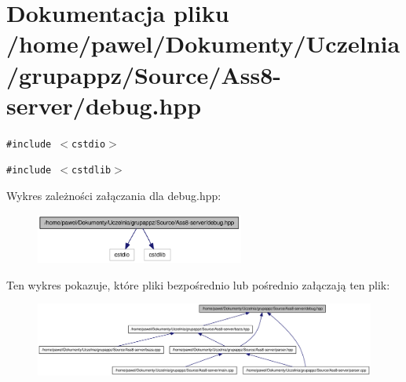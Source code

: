 \hypertarget{a00005}{
\section{Dokumentacja pliku /home/pawel/Dokumenty/Uczelnia/grupappz/Source/Ass8-server/debug.hpp}
\label{a00005}
}
{\tt \#include $<$cstdio$>$}\par
{\tt \#include $<$cstdlib$>$}\par


Wykres zależności załączania dla debug.hpp:\nopagebreak
\begin{figure}[H]
\begin{center}
\leavevmode
\includegraphics[width=194pt]{a00025}
\end{center}
\end{figure}


Ten wykres pokazuje, które pliki bezpośrednio lub pośrednio załączają ten plik:\nopagebreak
\begin{figure}[H]
\begin{center}
\leavevmode
\includegraphics[width=420pt]{a00026}
\end{center}
\end{figure}
